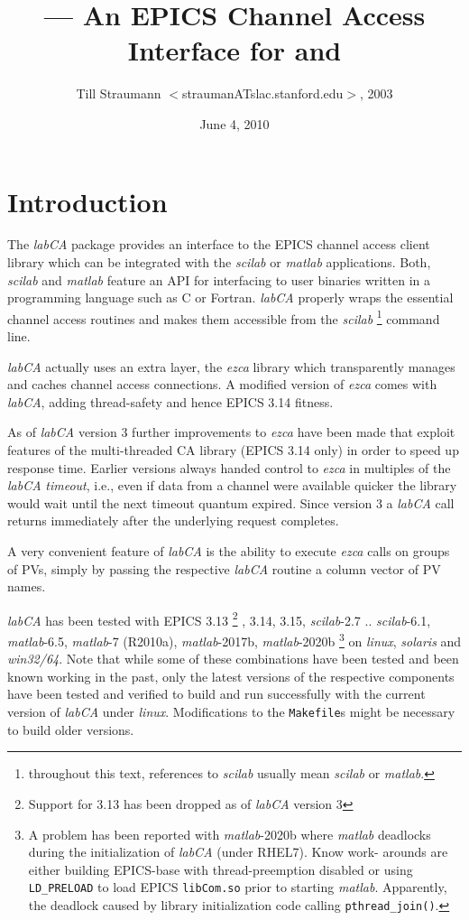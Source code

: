 \documentclass{article}
\title{\sca{} --- An EPICS Channel Access Interface for \scilab{} and \matlab{}}
\author{Till Straumann $<$straumanATslac.stanford.edu$>$, 2003}
\date{June 4, 2010}
\newcommand{\sca}{\ita{labCA}}
\newcommand{\scilab}{\ita{scilab}}
\newcommand{\matlab}{\ita{matlab}}
\newcommand{\windoze}{\ita{win32/64}}
\newcommand{\ezca}{\ita{ezca}}
\newcommand{\com}[1]{{\tt #1}}
\newcommand{\ita}[1]{\emph{#1}}
\begin{document}
\maketitle
{\hspace*{\fill}{\small\gitstring}\hspace*{\fill}}
\section{Introduction}
The \sca{} package provides an interface to the
EPICS channel access client library which can be
integrated with the \scilab{} or \matlab{} applications.
Both, \scilab{} and \matlab{} feature an API for interfacing
to user binaries written in a programming language such
as C or Fortran. \sca{} properly wraps the essential
channel access routines and makes them accessible
from the \scilab%
\footnote{throughout this text, references to \scilab{}
usually mean \scilab{} or \matlab.}
command line.

\sca{} actually uses an extra layer, the \ezca{} library
which transparently manages and caches channel access 
connections. A modified version of \ezca{} comes with
\sca, adding thread-safety and hence EPICS 3.14 fitness.

As of \sca{} version 3 further improvements to \ezca{}
have been made that exploit features of the multi-threaded
CA library (EPICS 3.14 only) in order to speed up response time.
Earlier versions always handed control to \ezca{} in multiples of the
\sca{} \ita{timeout}, i.e., even if data from a channel
were available quicker the library would wait until the
next timeout quantum expired. Since version 3 a \sca{}
call returns immediately after the underlying request
completes.

A very convenient feature of \sca{} is the ability
to execute \ezca{} calls on groups of PVs, simply by
passing the respective \sca{} routine a column vector
of PV names.

\sca{} has been tested with EPICS 3.13%
\footnote{Support for 3.13 has been dropped as of \sca{} version 3}%
,
3.14, 3.15, \scilab-2.7 .. \scilab-6.1,
\matlab-6.5, \matlab-7 (R2010a), \matlab-2017b, \matlab-2020b%
\footnote{A problem has been reported with \matlab-2020b where \matlab
deadlocks during the initialization of \sca{} (under RHEL7). Know work-
arounds are either building EPICS-base with thread-preemption disabled
or using {\tt LD\_PRELOAD} to load EPICS {\tt libCom.so} prior to starting
\matlab. Apparently, the deadlock caused by library initialization code
calling {\tt pthread\_join()}.
}
on \ita{linux}, \ita{solaris} and
\windoze. Note that while some of these combinations have been
tested and been known working in the past, only the latest
versions of the respective components have been tested
and verified to build and run successfully with the
current version of \sca{} under \ita{linux}.
Modifications to the \com{Makefile}s might be necessary to
build older versions.
\end{document}
